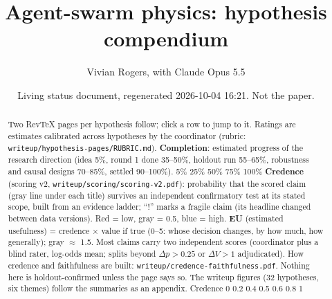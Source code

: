 \documentclass[aps,pre,onecolumn,10pt,nofootinbib]{revtex4-2}
\begin{document}
\title{Agent-swarm physics: hypothesis compendium}
\author{Vivian Rogers, with Claude Opus 5.5}
\date[]{Living status document, regenerated 2026-10-04 16:21. Not the paper.}
\begin{abstract}
Two RevTeX pages per hypothesis follow; click a row to jump to it. Ratings are estimates calibrated across hypotheses by the coordinator (rubric: \texttt{writeup/hypothesis-pages/RUBRIC.md}).
\textbf{Completion}: estimated progress of the research direction (idea 5\%, round 1 done 35--50\%, holdout run 55--65\%, robustness and causal designs 70--85\%, settled 90--100\%). \colorbox[HTML]{cde2fb}{\textcolor[HTML]{0b0b0b}{\scriptsize 5\%}} \colorbox[HTML]{9ec5f4}{\textcolor[HTML]{0b0b0b}{\scriptsize 25\%}} \colorbox[HTML]{5598e7}{\textcolor[HTML]{0b0b0b}{\scriptsize 50\%}} \colorbox[HTML]{256abf}{\textcolor[HTML]{ffffff}{\scriptsize 75\%}} \colorbox[HTML]{184f95}{\textcolor[HTML]{ffffff}{\scriptsize 100\%}}
\textbf{Credence} (scoring v2, \texttt{writeup/scoring/scoring-v2.pdf}): probability that the scored claim (gray line under each title) survives an independent confirmatory test at its stated scope, built from an evidence ladder; ``!'' marks a fragile claim (its headline changed between data versions). Red = low, gray = 0.5, blue = high.
\textbf{EU} (estimated usefulness) = credence $\times$ value if true (0--5: whose decision changes, by how much, how generally); gray $\approx$ 1.5. Most claims carry two independent scores (coordinator plus a blind rater, log-odds mean; splits beyond $\Delta p>0.25$ or $\Delta V>1$ adjudicated). How credence and faithfulness are built: \texttt{writeup/credence-faithfulness.pdf}. Nothing here is holdout-confirmed unless the page says so. The writeup figures (32 hypotheses, six themes) follow the summaries as an appendix. Credence \colorbox[HTML]{a32b2b}{\textcolor[HTML]{ffffff}{\scriptsize 0}} \colorbox[HTML]{e34948}{\textcolor[HTML]{0b0b0b}{\scriptsize 0.2}} \colorbox[HTML]{f5bcbb}{\textcolor[HTML]{0b0b0b}{\scriptsize 0.4}} \colorbox[HTML]{e9e7e1}{\textcolor[HTML]{0b0b0b}{\scriptsize 0.5}} \colorbox[HTML]{b7d3f6}{\textcolor[HTML]{0b0b0b}{\scriptsize 0.6}} \colorbox[HTML]{5598e7}{\textcolor[HTML]{ffffff}{\scriptsize 0.8}} \colorbox[HTML]{1c5cab}{\textcolor[HTML]{ffffff}{\scriptsize 1}}
\end{abstract}
\maketitle
\end{document}
